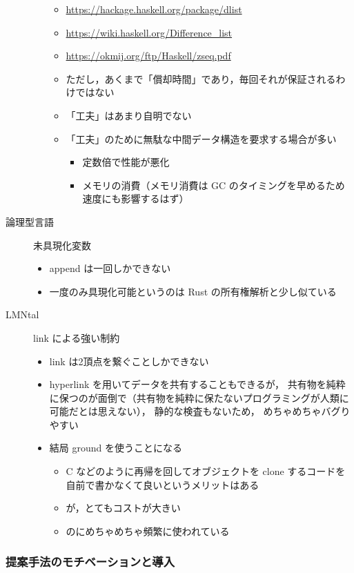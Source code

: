 \documentclass[10pt, a4j, twocolumn]{scrartcl}
\begin{document}
\begin{description}
\begin{itemize}
\begin{itemize}
\item \url{https://hackage.haskell.org/package/dlist}
\item \url{https://wiki.haskell.org/Difference\_list}
\item \url{https://okmij.org/ftp/Haskell/zseq.pdf}
\item ただし，あくまで「償却時間」であり，毎回それが保証されるわけではない
\item 「工夫」はあまり自明でない
\item 「工夫」のために無駄な中間データ構造を要求する場合が多い
\begin{itemize}
\item 定数倍で性能が悪化
\item メモリの消費（メモリ消費は GC のタイミングを早めるため速度にも影響するはず）
\end{itemize}
\end{itemize}
\end{itemize}
\item[{論理型言語}] 未具現化変数
\begin{itemize}
\item append は一回しかできない
\item 一度のみ具現化可能というのは Rust の所有権解析と少し似ている
\end{itemize}
\item[{LMNtal}] link による強い制約
\begin{itemize}
\item link は2頂点を繋ぐことしかできない
\item hyperlink を用いてデータを共有することもできるが，
共有物を純粋に保つのが面倒で（共有物を純粋に保たないプログラミングが人類に可能だとは思えない），
静的な検査もないため，
めちゃめちゃバグりやすい
\item 結局 ground を使うことになる
\begin{itemize}
\item C などのように再帰を回してオブジェクトを clone するコードを自前で書かなくて良いというメリットはある
\item が，とてもコストが大きい
\item のにめちゃめちゃ頻繁に使われている
\end{itemize}
\end{itemize}
\end{description}


\subsubsection{提案手法のモチベーションと導入}
\label{sec:orgf8c442d}
\end{document}
